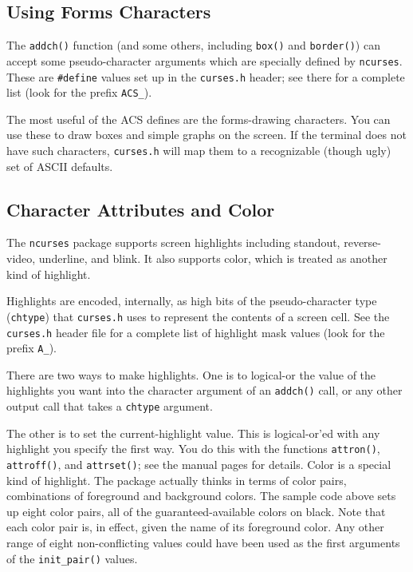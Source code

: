 \subsection{Using Forms Characters}

\label{f0:formschars}The \texttt{addch()} function (and some others, including \texttt{box()} and
\texttt{border()}) can accept some pseudo-character arguments which are specially
defined by \texttt{ncurses}.  These are \texttt{\#define} values set up in
the \texttt{curses.h} header; see there for a complete list (look for
the prefix \texttt{ACS\_}). 

The most useful of the ACS defines are the forms-drawing characters.  You can
use these to draw boxes and simple graphs on the screen.  If the terminal
does not have such characters, \texttt{curses.h} will map them to a
recognizable (though ugly) set of ASCII defaults.

\subsection{Character Attributes and Color}

\label{f0:attributes}The \texttt{ncurses} package supports screen highlights including standout,
reverse-video, underline, and blink.  It also supports color, which is treated
as another kind of highlight. 

Highlights are encoded, internally, as high bits of the pseudo-character type
(\texttt{chtype}) that \texttt{curses.h} uses to represent the contents of a
screen cell.  See the \texttt{curses.h} header file for a complete list of
highlight mask values (look for the prefix \texttt{A\_}).

There are two ways to make highlights.  One is to logical-or the value of the
highlights you want into the character argument of an \texttt{addch()} call,
or any other output call that takes a \texttt{chtype} argument. 

The other is to set the current-highlight value.  This is logical-or'ed with
any highlight you specify the first way.  You do this with the functions
\texttt{attron()}, \texttt{attroff()}, and \texttt{attrset()}; see the manual
pages for details.
Color is a special kind of highlight.  The package actually thinks in terms
of color pairs, combinations of foreground and background colors.  The sample
code above sets up eight color pairs, all of the guaranteed-available colors
on black.  Note that each color pair is, in effect, given the name of its
foreground color.  Any other range of eight non-conflicting values could
have been used as the first arguments of the \texttt{init\_pair()} values. 


